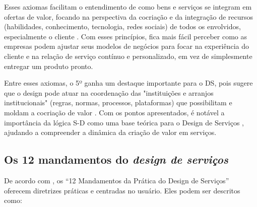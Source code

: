Esses axiomas facilitam o entendimento de como bens e serviços se integram em ofertas de valor, focando na perspectiva da cocriação e da integração de recursos (habilidades, conhecimento, tecnologia, redes sociais) de todos os envolvidos, especialmente o cliente \cite{yan2022pssvalue}. Com esses princípios, fica mais fácil perceber como as empresas podem ajustar seus modelos de negócios para focar na experiência do cliente e na relação de serviço contínuo e personalizado, em vez de simplesmente entregar um produto pronto.

Entre esses axiomas, o 5º ganha um destaque importante para o DS, pois sugere que o design pode atuar na coordenação das "instituições e arranjos institucionais" (regras, normas, processos, plataformas) que possibilitam e moldam a cocriação de valor \cite{VargoLusch2016Institutions}. Com os pontos apresentados, é notável a importância da lógica S-D como uma base teórica para o Design de Serviços \cite{Patricio2011Multilevel}, ajudando a compreender a dinâmica da criação de valor em serviços.

\subsection{Os 12 mandamentos do \textit{design de serviços}}

De acordo com , os ``12 Mandamentos da Prática do Design de Serviços'' oferecem diretrizes práticas e centradas no usuário. Eles podem ser descritos como:

